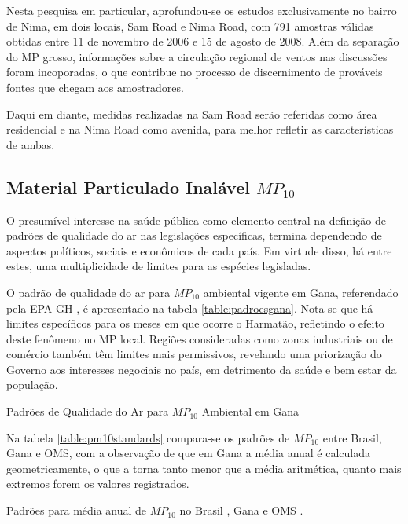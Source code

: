 Nesta pesquisa em particular, aprofundou-se os estudos exclusivamente no bairro
de Nima, em dois locais, Sam Road e Nima Road, com 791 amostras válidas obtidas
entre 11 de novembro de 2006 e 15 de agosto de 2008. Além da separação do MP 
grosso, informações sobre a circulação regional de ventos nas discussões foram 
incoporadas, o que contribue no processo de discernimento de prováveis fontes 
que chegam aos amostradores.

Daqui em diante, medidas realizadas na Sam Road serão referidas como área 
residencial e na Nima Road como avenida, para melhor refletir as características
de ambas.

\subsection{Material Particulado Inalável $MP_{10}$}

O presumível interesse na saúde pública como elemento central na definição de 
padrões de qualidade do ar nas legislações específicas, termina dependendo de
aspectos políticos, sociais e econômicos de cada país. Em virtude disso, há entre
estes, uma multiplicidade de limites para as espécies legisladas.

O padrão de qualidade do ar para $MP_{10}$ ambiental vigente em Gana, referendado
pela EPA-GH \citeyearpar{epa2015}, é apresentado na tabela 
\ref{table:padroesgana}. Nota-se que há limites específicos para os meses em que 
ocorre o Harmatão, refletindo o efeito deste fenômeno no MP local. 
Regiões consideradas como zonas industriais ou de comércio também têm limites 
mais permissivos, revelando uma priorização do Governo aos interesses negociais
no país, em detrimento da saúde e bem estar da população.

\begin{table}[H]
\centering
  
\caption{Padrões de Qualidade do Ar para $MP_{10}$ Ambiental em Gana
         \cite{epa2015} \label{table:padroesgana}}
\end{table}

Na tabela \ref{table:pm10standards} compara-se os padrões de $MP_{10}$ entre 
Brasil, Gana e OMS, com a observação de que em Gana a média anual é calculada 
geometricamente, o que a torna tanto menor que a média aritmética, quanto 
mais extremos forem os valores registrados.

\begin{table}[H]
\centering
  
  \caption{Padrões para média anual de $MP_{10}$ no Brasil \citep{conama1990}, 
           Gana \citep{epa2015} e OMS \citep{who}. \label{table:pm10standards}}
\end{table}

